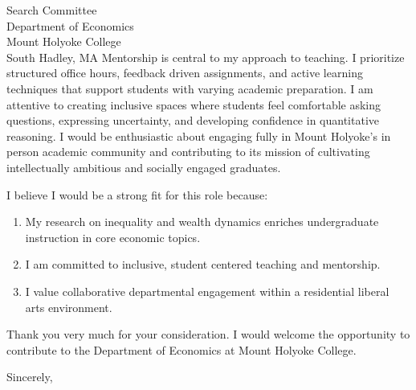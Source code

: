 \documentclass[11pt,letterpaper]{letter}
\begin{document}
\begin{letter}{
Search Committee \\
Department of Economics \\
Mount Holyoke College \\
South Hadley, MA
}
Mentorship is central to my approach to teaching. I prioritize structured office hours, feedback driven assignments, and active learning techniques that support students with varying academic preparation. I am attentive to creating inclusive spaces where students feel comfortable asking questions, expressing uncertainty, and developing confidence in quantitative reasoning. I would be enthusiastic about engaging fully in Mount Holyoke’s in person academic community and contributing to its mission of cultivating intellectually ambitious and socially engaged graduates.

I believe I would be a strong fit for this role because:
\begin{enumerate}
    \item My research on inequality and wealth dynamics enriches undergraduate instruction in core economic topics.
    \item I am committed to inclusive, student centered teaching and mentorship.
    \item I value collaborative departmental engagement within a residential liberal arts environment.
\end{enumerate}

Thank you very much for your consideration. I would welcome the opportunity to contribute to the Department of Economics at Mount Holyoke College.

\closing{Sincerely,}

\end{letter}
\end{document}
